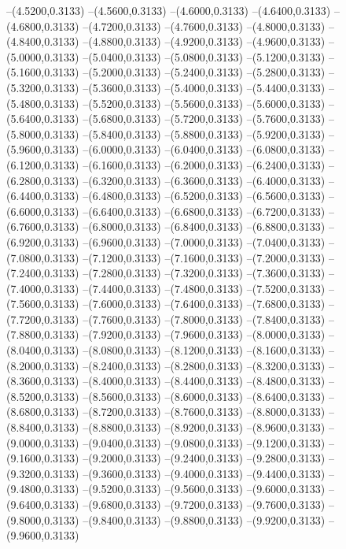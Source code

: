 {	--(4.5200,0.3133)
	--(4.5600,0.3133)
	--(4.6000,0.3133)
	--(4.6400,0.3133)
	--(4.6800,0.3133)
	--(4.7200,0.3133)
	--(4.7600,0.3133)
	--(4.8000,0.3133)
	--(4.8400,0.3133)
	--(4.8800,0.3133)
	--(4.9200,0.3133)
	--(4.9600,0.3133)
	--(5.0000,0.3133)
	--(5.0400,0.3133)
	--(5.0800,0.3133)
	--(5.1200,0.3133)
	--(5.1600,0.3133)
	--(5.2000,0.3133)
	--(5.2400,0.3133)
	--(5.2800,0.3133)
	--(5.3200,0.3133)
	--(5.3600,0.3133)
	--(5.4000,0.3133)
	--(5.4400,0.3133)
	--(5.4800,0.3133)
	--(5.5200,0.3133)
	--(5.5600,0.3133)
	--(5.6000,0.3133)
	--(5.6400,0.3133)
	--(5.6800,0.3133)
	--(5.7200,0.3133)
	--(5.7600,0.3133)
	--(5.8000,0.3133)
	--(5.8400,0.3133)
	--(5.8800,0.3133)
	--(5.9200,0.3133)
	--(5.9600,0.3133)
	--(6.0000,0.3133)
	--(6.0400,0.3133)
	--(6.0800,0.3133)
	--(6.1200,0.3133)
	--(6.1600,0.3133)
	--(6.2000,0.3133)
	--(6.2400,0.3133)
	--(6.2800,0.3133)
	--(6.3200,0.3133)
	--(6.3600,0.3133)
	--(6.4000,0.3133)
	--(6.4400,0.3133)
	--(6.4800,0.3133)
	--(6.5200,0.3133)
	--(6.5600,0.3133)
	--(6.6000,0.3133)
	--(6.6400,0.3133)
	--(6.6800,0.3133)
	--(6.7200,0.3133)
	--(6.7600,0.3133)
	--(6.8000,0.3133)
	--(6.8400,0.3133)
	--(6.8800,0.3133)
	--(6.9200,0.3133)
	--(6.9600,0.3133)
	--(7.0000,0.3133)
	--(7.0400,0.3133)
	--(7.0800,0.3133)
	--(7.1200,0.3133)
	--(7.1600,0.3133)
	--(7.2000,0.3133)
	--(7.2400,0.3133)
	--(7.2800,0.3133)
	--(7.3200,0.3133)
	--(7.3600,0.3133)
	--(7.4000,0.3133)
	--(7.4400,0.3133)
	--(7.4800,0.3133)
	--(7.5200,0.3133)
	--(7.5600,0.3133)
	--(7.6000,0.3133)
	--(7.6400,0.3133)
	--(7.6800,0.3133)
	--(7.7200,0.3133)
	--(7.7600,0.3133)
	--(7.8000,0.3133)
	--(7.8400,0.3133)
	--(7.8800,0.3133)
	--(7.9200,0.3133)
	--(7.9600,0.3133)
	--(8.0000,0.3133)
	--(8.0400,0.3133)
	--(8.0800,0.3133)
	--(8.1200,0.3133)
	--(8.1600,0.3133)
	--(8.2000,0.3133)
	--(8.2400,0.3133)
	--(8.2800,0.3133)
	--(8.3200,0.3133)
	--(8.3600,0.3133)
	--(8.4000,0.3133)
	--(8.4400,0.3133)
	--(8.4800,0.3133)
	--(8.5200,0.3133)
	--(8.5600,0.3133)
	--(8.6000,0.3133)
	--(8.6400,0.3133)
	--(8.6800,0.3133)
	--(8.7200,0.3133)
	--(8.7600,0.3133)
	--(8.8000,0.3133)
	--(8.8400,0.3133)
	--(8.8800,0.3133)
	--(8.9200,0.3133)
	--(8.9600,0.3133)
	--(9.0000,0.3133)
	--(9.0400,0.3133)
	--(9.0800,0.3133)
	--(9.1200,0.3133)
	--(9.1600,0.3133)
	--(9.2000,0.3133)
	--(9.2400,0.3133)
	--(9.2800,0.3133)
	--(9.3200,0.3133)
	--(9.3600,0.3133)
	--(9.4000,0.3133)
	--(9.4400,0.3133)
	--(9.4800,0.3133)
	--(9.5200,0.3133)
	--(9.5600,0.3133)
	--(9.6000,0.3133)
	--(9.6400,0.3133)
	--(9.6800,0.3133)
	--(9.7200,0.3133)
	--(9.7600,0.3133)
	--(9.8000,0.3133)
	--(9.8400,0.3133)
	--(9.8800,0.3133)
	--(9.9200,0.3133)
	--(9.9600,0.3133)
}
